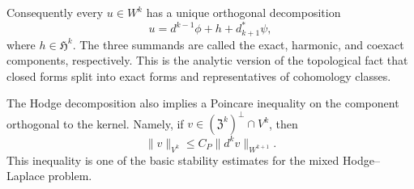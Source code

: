 \documentclass{article}
\DeclareMathOperator{\grad}{grad}
\DeclareMathOperator{\curl}{curl}
\DeclareMathOperator{\divergence}{div}
\newcommand{\f}[1]{\mathfrak{#1}}
\begin{document}
Consequently every $u\in W^k$ has a unique orthogonal decomposition
\[	u
	=
	d^{k-1}\phi
	+
	h
	+
	d_{k+1}^*\psi,
\]
where $h\in \f H^k$.  The three summands are called the exact, harmonic, and
coexact components, respectively.  This is the analytic version of the
topological fact that closed forms split into exact forms and representatives of
cohomology classes.

The Hodge decomposition also implies a Poincare inequality on the component
orthogonal to the kernel.  Namely, if $v\in (\f Z^k)^\perp\cap V^k$, then
\begin{equation}
	\|v\|_{V^k}
	\leq
	C_P \|d^k v\|_{W^{k+1}}.
\end{equation}
This inequality is one of the basic stability estimates for the mixed
Hodge--Laplace problem.



\end{document}
